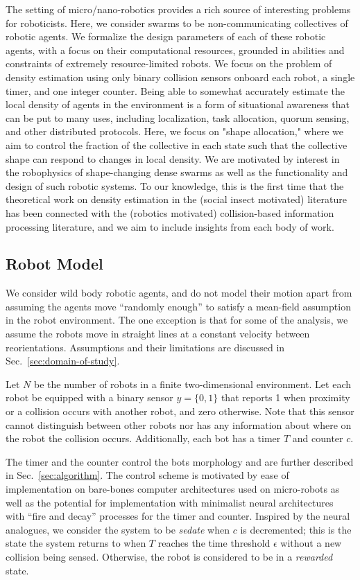 \documentclass[runningheads]{llncs}
\begin{document}
The setting of micro/nano-robotics provides a rich source of interesting problems for roboticists. Here, we consider swarms to be non-communicating collectives of robotic agents. We formalize the design parameters of each of these robotic agents, with a focus on their computational resources, grounded in abilities and constraints of extremely resource-limited robots.
We focus on the problem of density estimation using only binary collision sensors onboard each robot, a single timer, and one integer counter. Being able to somewhat accurately estimate the local density of agents in the environment is a form of situational awareness that can be put to many uses, including localization, task allocation, quorum sensing, and other distributed protocols. Here, we focus on "shape allocation," where we aim to control the fraction of the collective in each state such that the collective shape can respond to changes in local density. We are motivated by interest in the robophysics of shape-changing dense swarms as well as the functionality and design of such robotic systems. To our knowledge, this is the first time that the theoretical work on density estimation in the (social insect motivated) literature has been connected with the (robotics motivated) collision-based information processing literature, and we aim to include insights from each body of work.

\subsection{Robot Model}

We consider wild body robotic agents, and do not model their motion apart from assuming the agents move ``randomly enough'' to satisfy a mean-field assumption in the robot environment. The one exception is that for some of the analysis, we assume the robots move in straight lines at a constant velocity between reorientations. Assumptions and their limitations are discussed in Sec.~\ref{sec:domain-of-study}.

Let $N$ be the number of robots in a finite two-dimensional environment. Let each robot be equipped with a binary sensor $y=\{0,1\}$ that reports 1 when proximity or a collision occurs with another robot, and zero otherwise. Note that this sensor cannot distinguish between other robots nor has any information about where on the robot the collision occurs.
Additionally, each bot has a timer $T$ and counter $c$.

The timer and the counter control the bots morphology and are further described in Sec.~\ref{sec:algorithm}. The control scheme is motivated by ease of implementation on bare-bones computer architectures used on micro-robots \cite{lassiter2025microscopic} as well as the potential for implementation with minimalist neural architectures with ``fire and decay'' processes for the timer and counter. Inspired by the neural analogues, we consider the system to be \emph{sedate} when $c$ is decremented; this is the state the system returns to when $T$ reaches the time threshold $\epsilon$ without a new collision being sensed. Otherwise, the robot is considered to be in a \emph{rewarded} state.
\end{document}
